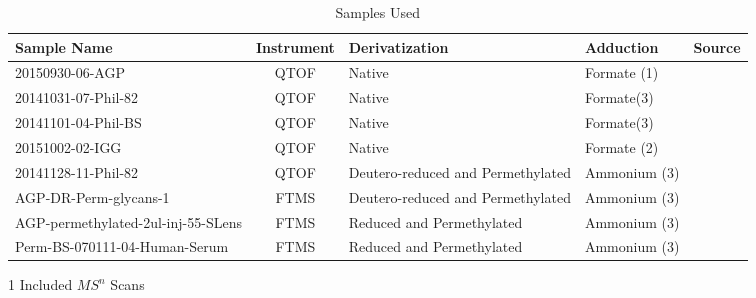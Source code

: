     \renewcommand{\arraystretch}{1.5}
    \begin{table}
        \caption{Samples Used}\label{tbl:sample_overview}
        \centering
        \begin{threeparttable}
        \begin{tabular}{p{4.1cm} | c | p{3cm} | p{3cm} | c}
            Sample Name & Instrument & Derivatization & Adduction & Source\\
            \hline
            20150930-06-AGP & QTOF & Native & Formate (1) & \cite{Khatri2016a}\\
            20141031-07-Phil-82 & QTOF & Native & Formate(3) & \cite{Khatri2016a}\\
            20141101-04-Phil-BS & QTOF & Native & Formate(3) & \cite{Khatri2016a}\\
            20151002-02-IGG & QTOF & Native & Formate (2) & \cite{Khatri2016b}\\
            20141128-11-Phil-82\tnote{1} & QTOF &
                Deutero-reduced and Permethylated & Ammonium (3) & \cite{Khatri2016a}\\
            AGP-DR-Perm-glycans-1\tnote{1} & FTMS &
                Deutero-reduced and Permethylated & Ammonium (3) & \cite{Khatri2016a}\\
            AGP-permethylated-2ul-inj-55-SLens\tnote{1} & FTMS &
                Reduced and Permethylated & Ammonium (3) & \cite{Khatri2016a}\\
            Perm-BS-070111-04-Human-Serum\tnote{1} & FTMS &
                Reduced and Permethylated & Ammonium (3) & \cite{Yu2013}\\
        \end{tabular}
        \begin{tablenotes}
            \item[1] Included $MS^n$ Scans
        \end{tablenotes}
        \end{threeparttable}
    \end{table}
    \renewcommand{\arraystretch}{1.0}